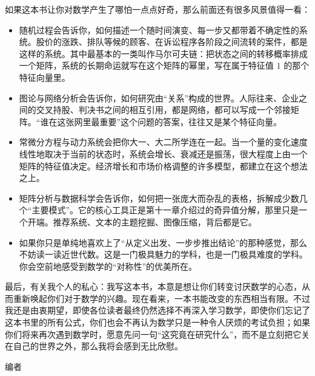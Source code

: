 \documentclass[lang=cn,10.5pt,scheme=chinese,toc=twocol,section,chinesefont=nofont,
twoside,citestyle=gb7714-2015,bibstyle=gb7714-2015]{elegantbook}
\DeclareRobustCommand{\textbf}[1]{{\lnsemiboldlatin\lnsemiboldcjk #1}}
\numberwithin{equation}{section}   %
\begin{document}
{  如果这本书让你对数学产生了哪怕一点点好奇，那么前面还有很多风景值得一看：

  \begin{itemize}
    \item \textbf{随机过程}会告诉你，如何描述一个随时间演变、每一步又都带着不确定性的系统。股价的涨跌、排队等候的顾客、在诉讼程序各阶段之间流转的案件，都是这样的系统。其中最基本的一类叫作马尔可夫链：把状态之间的转移概率排成一个矩阵，系统的长期命运就写在这个矩阵的幂里，写在属于特征值 $1$ 的那个特征向量里。
    \item \textbf{图论与网络分析}会告诉你，如何研究由“关系”构成的世界。人际往来、企业之间的交叉持股、判决书之间的相互引用，都是网络，都可以写成一个邻接矩阵。“谁在这张网里最重要”这个问题的答案，往往又是某个特征向量。
    \item \textbf{常微分方程与动力系统}会把你大一、大二所学连在一起。当一个量的变化速度线性地取决于当前的状态时，系统会增长、衰减还是振荡，很大程度上由一个矩阵的特征值决定。经济增长和市场价格调整的许多模型，都建立在这个想法之上。
    \item \textbf{矩阵分析与数据科学}会告诉你，如何把一张庞大而杂乱的表格，拆解成少数几个“主要模式”。它的核心工具正是第十一章介绍过的奇异值分解，那里只是一个开端。推荐系统、文本的主题挖掘、图像压缩，背后都是它。
    \item 如果你只是单纯地喜欢上了“从定义出发、一步步推出结论”的那种感觉，那么不妨读一读\textbf{近世代数}。这是一门极具魅力的学科，也是一门极具难度的学科。你会空前地感受到数学的“对称性”的优美所在。
  \end{itemize}

  最后，有关我个人的私心：我写这本书，本意是想让你们转变讨厌数学的心态，从而重新唤起你们对于数学的兴趣。现在看来，一本书能改变的东西相当有限。不过我还是由衷期望，即使各位读者最终仍然选择不再深入学习数学，即使你们忘记了这本书里的所有公式，你们也会不再认为数学只是一种令人厌烦的考试负担；如果你们将来再次遇到数学时，愿意先问一句“这究竟在研究什么”，而不是立刻把它关在自己的世界之外，那么我将会感到无比欣慰。
}
\vspace{1em}
\begin{flushright}
  编者
\end{flushright}

\appendix

\nocite{*}
\printbibliography[heading=bibintoc, title=\ebibname]
\end{document}

